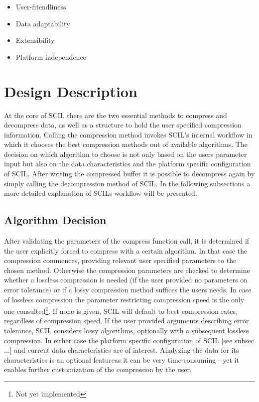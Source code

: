 \documentclass[
	12pt,
	a4paper,
	BCOR10mm,
	DIV14,
	headsepline,
]{scrreprt}
\begin{document}
\bigskip

\begin{itemize}
	\item User-friendliness
	\item Data adaptability
	\item Extensibility
	\item Platform independence
\end{itemize}

\bigskip

\clearpage

\section{Design Description}

\bigskip

At the core of SCIL there are the two essential methods to compress and
decompress data, as well as a structure to hold the user specified compression
information. Calling the compression method invokes SCIL's internal workflow in
which it chooses the best compression methods out of available algorithms.
The decision on which algorithm to choose is not only based on the users
parameter input but also on the data characteristics and the platform specific
configuration of SCIL. After writing the compressed buffer it is possible to
decompress again by simply calling the decompression method of SCIL.
In the following subsections a more detailed explanation of SCILs workflow
will be presented.

\bigskip

\subsection{Algorithm Decision}

\bigskip

After validating the parameters of the compress function call, it is determined
if the user explicitly forced to compress with a certain algorithm. In that case
the compression commences, providing relevant user specified parameters to the
chosen method. Otherwise the compression parameters are checked to determine
whether a lossless compression is needed (if the user provided no parameters on
error tolerance) or if a lossy compression method suffices the users needs. In
case of lossless compression the parameter restricting compression speed is
the only one consulted\footnote{Not yet implemented}. If none is given, SCIL
will default to best compression rates, regardless of compression speed. If the
user provided arguments describing error tolerance, SCIL considers lossy
algorithms, optionally with a subsequent lossless
compression\footnotemark[\value{footnote}]. In either case the platform specific
configuration of SCIL [see subsec ...] and current data characteristics are of
interest. Analyzing the data for its characteristics is an optional
feature\footnotemark[\value{footnote}] as it can be very time-consuming - yet it
enables further customization of the compression by the user.
\end{document}
